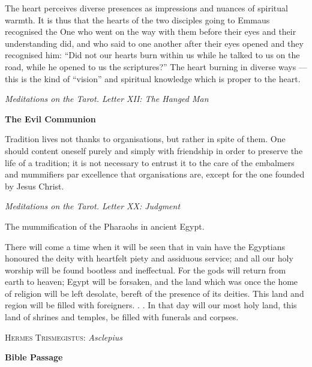 \begin{quotationx}
The heart perceives diverse presences as impressions and nuances of spiritual warmth. It is thus that the hearts of the
two disciples going to Emmaus recognised the One who went on the way with them before their eyes and their
understanding did, and who said to one another after their eyes opened and they recognised him: “Did not our hearts
burn within us while he talked to us on the road, while he opened to us the scriptures?” The heart burning in diverse
ways — this is the kind of “vision” and spiritual knowledge which is proper to the heart. \begin{flushright}
\emph{Meditations on the Tarot. Letter XII: The Hanged Man}\end{flushright}

\end{quotationx}

\textbf{The Evil Communion}

\begin{quotationx}
Tradition lives not thanks to organisations, but rather in spite of them. One should content oneself purely and simply
with friendship in order to preserve the life of a tradition; it is not necessary to entrust it to the care of the
embalmers and mummifiers par excellence that organisations are, except for the one founded by Jesus Christ. \begin{flushright}
\emph{Meditations on the Tarot. Letter XX: Judgment}\end{flushright}

\end{quotationx}
The mummification of the Pharaohs in ancient Egypt.

\begin{quotationx}
There will come a time when it will be seen that in vain have the Egyptians honoured the deity with heartfelt piety and
assiduous service; and all our holy worship will be found bootless and ineffectual. For the gods will return from earth
to heaven; Egypt will be forsaken, and the land which was once the home of religion will be left desolate, bereft of
the presence of its deities. This land and region will be filled with foreigners. . . In that day will our most holy
land, this land of shrines and temples, be filled with funerals and corpses. \begin{flushright} \textsc{Hermes Trismegistus:} \emph{Asclepius}\end{flushright} 

\end{quotationx}
\textbf{Bible Passage}

